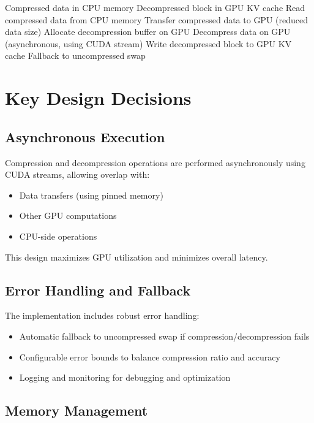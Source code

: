 \documentclass{polyu-comp}
\begin{document}
\begin{algorithm}[H]
\caption{H2D Compressed Swap}
\begin{algorithmic}[1]
\REQUIRE Compressed data in CPU memory
\ENSURE Decompressed block in GPU KV cache
\STATE Read compressed data from CPU memory
\STATE Transfer compressed data to GPU (reduced data size)
\STATE Allocate decompression buffer on GPU
\STATE Decompress data on GPU (asynchronous, using CUDA stream)
\STATE Write decompressed block to GPU KV cache
    \STATE Fallback to uncompressed swap
\ENDIF
\end{algorithmic}
\end{algorithm}

\section{Key Design Decisions}

\subsection{Asynchronous Execution}

Compression and decompression operations are performed asynchronously using CUDA streams, allowing overlap with:
\begin{itemize}
    \item Data transfers (using pinned memory)
    \item Other GPU computations
    \item CPU-side operations
\end{itemize}

This design maximizes GPU utilization and minimizes overall latency.

\subsection{Error Handling and Fallback}

The implementation includes robust error handling:
\begin{itemize}
    \item Automatic fallback to uncompressed swap if compression/decompression fails
    \item Configurable error bounds to balance compression ratio and accuracy
    \item Logging and monitoring for debugging and optimization
\end{itemize}

\subsection{Memory Management}
\end{document}
